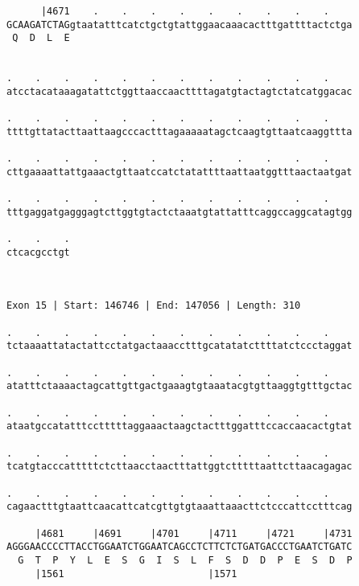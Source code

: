 \documentclass{article}
\begin{document}
\begin{Verbatim}
      |4671    .    .    .    .    .    .    .    .    .    
GCAAGATCTAGgtaatatttcatctgctgtattggaacaaacactttgattttactctga
 Q  D  L  E                                                 
                                                            
  
.    .    .    .    .    .    .    .    .    .    .    .    
atcctacataaagatattctggttaaccaacttttagatgtactagtctatcatggacac
                                                            
.    .    .    .    .    .    .    .    .    .    .    .    
ttttgttatacttaattaagcccactttagaaaaatagctcaagtgttaatcaaggttta
                                                            
.    .    .    .    .    .    .    .    .    .    .    .    
cttgaaaattattgaaactgttaatccatctatattttaattaatggtttaactaatgat
                                                            
.    .    .    .    .    .    .    .    .    .    .    .    
tttgaggatgagggagtcttggtgtactctaaatgtattatttcaggccaggcatagtgg
                                                            
.    .    .
ctcacgcctgt
           
           
 
Exon 15 | Start: 146746 | End: 147056 | Length: 310
 
.    .    .    .    .    .    .    .    .    .    .    .    
tctaaaattatactattcctatgactaaacctttgcatatatcttttatctccctaggat
                                                            
.    .    .    .    .    .    .    .    .    .    .    .    
atatttctaaaactagcattgttgactgaaagtgtaaatacgtgttaaggtgtttgctac
                                                            
.    .    .    .    .    .    .    .    .    .    .    .    
ataatgccatatttcctttttaggaaactaagctactttggatttccaccaacactgtat
                                                            
.    .    .    .    .    .    .    .    .    .    .    .    
tcatgtacccatttttctcttaacctaactttattggtctttttaattcttaacagagac
                                                            
.    .    .    .    .    .    .    .    .    .    .    .    
cagaactttgtaattcaacattcatcgttgtgtaaattaaacttctcccattcctttcag
                                                            
     |4681     |4691     |4701     |4711     |4721     |4731
AGGGAACCCCTTACCTGGAATCTGGAATCAGCCTCTTCTCTGATGACCCTGAATCTGATC
  G  T  P  Y  L  E  S  G  I  S  L  F  S  D  D  P  E  S  D  P
     |1561                         |1571                    
  

\end{Verbatim}
\end{document}

